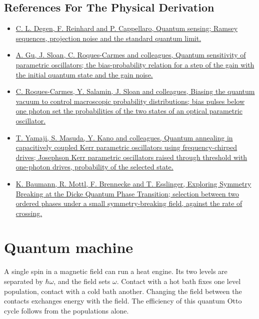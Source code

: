 \documentclass[11pt,oneside]{book}
\begin{document}
\subsection*{References For The Physical Derivation}
\begin{itemize}
\item \href{https://arxiv.org/abs/1611.02427}{C. L. Degen, F. Reinhard and P. Cappellaro, Quantum sensing; Ramsey sequences, projection noise and the standard quantum limit.}
\item \href{https://arxiv.org/abs/2412.02887}{A. Gu, J. Sloan, C. Roques-Carmes and colleagues, Quantum sensitivity of parametric oscillators; the bias-probability relation for a step of the gain with the initial quantum state and the gain noise.}
\item \href{https://arxiv.org/abs/2303.03455}{C. Roques-Carmes, Y. Salamin, J. Sloan and colleagues, Biasing the quantum vacuum to control macroscopic probability distributions; bias pulses below one photon set the probabilities of the two states of an optical parametric oscillator.}
\item \href{https://arxiv.org/abs/2506.23539}{T. Yamaji, S. Masuda, Y. Kano and colleagues, Quantum annealing in capacitively coupled Kerr parametric oscillators using frequency-chirped drives; Josephson Kerr parametric oscillators raised through threshold with one-photon drives, probability of the selected state.}
\item \href{https://arxiv.org/abs/1105.0426}{K. Baumann, R. Mottl, F. Brennecke and T. Esslinger, Exploring Symmetry Breaking at the Dicke Quantum Phase Transition; selection between two ordered phases under a small symmetry-breaking field, against the rate of crossing.}
\end{itemize}





\clearpage

\section{Quantum machine}

\label{topic:quantum-machine}

A single spin in a magnetic field can run a heat engine. Its two levels are separated by \(\hbar\omega\), and the field sets \(\omega\). Contact with a hot bath fixes one level population, contact with a cold bath another. Changing the field between the contacts exchanges energy with the field. The efficiency of this quantum Otto cycle follows from the populations alone.
\end{document}
